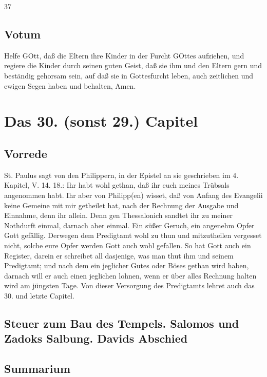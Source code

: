 37

\section{Votum}

Helfe GOtt, daß die Eltern ihre Kinder in der Furcht GOttes aufziehen, und regiere die Kinder durch seinen guten Geist, daß sie ihm und den Eltern gern und beständig gehorsam sein, auf daß sie in Gottesfurcht leben, auch zeitlichen und ewigen Segen haben und behalten, Amen.

\chapter{Das 30. (sonst 29.) Capitel}

\section{Vorrede}

St. Paulus sagt von den Philippern, in der Epistel an sie geschrieben im 4. Kapitel, V. 14. 18.: Ihr habt wohl gethan, daß ihr euch meines Trübsals angenommen habt. Ihr aber von Philipp(en) wisset, daß von Anfang des Evangelii keine Gemeine mit mir getheilet hat, nach der Rechnung der Ausgabe und Einnahme, denn ihr allein. Denn gen Thessalonich sandtet ihr zu meiner Nothdurft einmal, darnach aber einmal. Ein süßer Geruch, ein angenehm Opfer Gott gefällig. Derwegen dem Predigtamt wohl zu thun und mitzutheilen vergesset nicht, solche eure Opfer werden Gott auch wohl gefallen. So hat Gott auch ein Register, darein er schreibet all dasjenige, was man thut ihm und seinem Predigtamt; und nach dem ein jeglicher Gutes oder Böses gethan wird haben, darnach will er auch einen jeglichen lohnen, wenn er über alles Rechnung halten wird am jüngsten Tage. Von dieser Versorgung des Predigtamts lehret auch das 30. und letzte Capitel.

\section[Steuer zum Bau des Tempels. Salomos und Zadoks]{Steuer zum Bau des Tempels. Salomos und Zadoks Salbung. Davids Abschied}

\section{Summarium}

